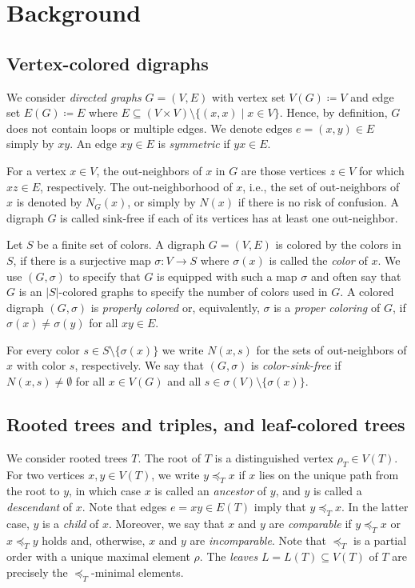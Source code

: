 \documentclass[final,3p,times]{elsarticle}
\begin{document}
\section{Background}
\label{sec:background}
\subsection{Vertex-colored digraphs}


We consider \emph{directed graphs} $G=(V,E)$ with vertex set $V(G)\coloneqq V$
and edge set $E(G)\coloneqq E$ where $E\subseteq (V\times V)\setminus
\{(x,x)\mid x\in V\}$. Hence, by definition, $G$ does not contain loops or
multiple edges. We denote edges $e=(x,y)\in E$ simply by $xy$. 
An edge $xy\in E$ is \emph{symmetric} if $yx\in E$. 

For a vertex $x\in V$, the out-neighbors of $x$ in $G$
are those vertices $z\in V$ for which $xz\in E$, respectively. The 
out-neighborhood of $x$, i.e., the set of out-neighbors of $x$ is denoted by $N_G(x)$, or 
simply by $N(x)$ if there is no risk of confusion. 
A digraph $G$ is called sink-free if each of its vertices has at least one out-neighbor.

Let $S$ be a finite set of colors. A digraph $G=(V,E)$ is colored by the colors
in $S$, if there is a surjective map $\sigma: V\to S$ where $\sigma(x)$ is
called the \emph{color} of $x$. We use $(G,\sigma)$ to specify that $G$ is
equipped with such a map $\sigma$ and often say that $G$ is an $|S|$-colored
graphs to specify the number of colors used in $G$. A colored digraph $(G,
\sigma)$ is \emph{properly colored} or, equivalently, $\sigma$ is a \emph{proper
coloring} of $G$, if $\sigma(x)\neq \sigma(y)$ for all $xy\in E$. 

For every color $s\in S\setminus \{\sigma(x)\}$ we write $N(x,s)$ for the sets
of out-neighbors of $x$ with color $s$, respectively. We say that $(G,\sigma)$
is \emph{color-sink-free} if $N(x,s)\ne\emptyset$ for all $x\in V(G)$ and all
$s\in \sigma(V)\setminus\{\sigma(x)\}$.


\subsection{Rooted trees and triples, and leaf-colored trees} 
We consider rooted trees $T$. The root of $T$ is a distinguished vertex
$\rho_T\in V(T)$. For two vertices $x,y\in V(T)$, we write $y \preceq_{T} x$ if
$x$ lies on the unique path from the root to $y$, in which case $x$ is called an
\emph{ancestor} of $y$, and $y$ is called a \emph{descendant} of $x$. Note that
edges $e=xy\in E(T)$ imply that $y\preceq_T x$. In the latter case, $y$ is a
\emph{child} of $x$. Moreover, we say that $x$ and $y$ are \emph{comparable} if
$y\preceq_{T} x$ or $x\preceq_{T} y$ holds and, otherwise, $x$ and $y$ are
\emph{incomparable}. Note that $\preceq_{T}$ is a partial order with a unique
maximal element $\rho$. The \emph{leaves} $L=L(T)\subseteq V(T)$ of $T$ are
precisely the $\preceq_{T}$-minimal elements.
\end{document}
